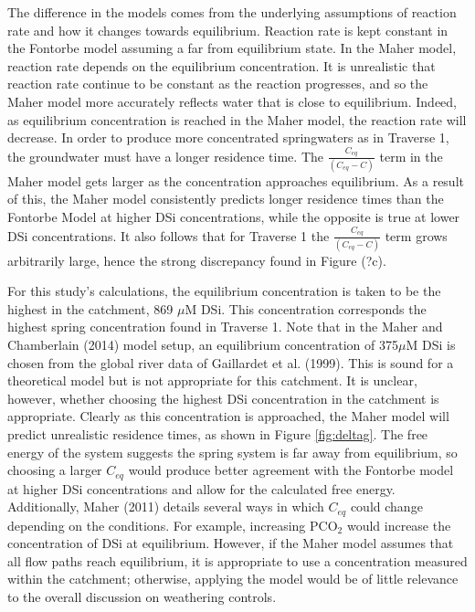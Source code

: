 The difference in the models comes from the underlying assumptions of reaction rate and how it changes towards equilibrium. Reaction rate is kept constant in the Fontorbe model assuming a far from equilibrium state. In the Maher model, reaction rate depends on the equilibrium concentration. It is unrealistic that reaction rate continue to be constant as the reaction progresses, and so the Maher model more accurately reflects water that is close to equilibrium. Indeed, as equilibrium concentration is reached in the Maher model, the reaction rate will decrease. In order to produce more concentrated springwaters as in Traverse 1, the groundwater must have a longer residence time. The $\frac{C_{eq}}{(C_{eq} - C)}$ term in the Maher model gets larger as the concentration approaches equilibrium. As a result of this, the Maher model consistently predicts longer residence times than the Fontorbe Model at higher DSi concentrations, while the opposite is true at lower DSi concentrations. It also follows that for Traverse 1 the $\frac{C_{eq}}{(C_{eq} - C)}$ term grows arbitrarily large, hence the strong discrepancy found in Figure (?c).

\bsk

For this study's calculations, the equilibrium concentration is taken to be the highest in the catchment, 869 $\mu$M DSi. This concentration corresponds the highest spring concentration found in Traverse 1. Note that in the Maher and Chamberlain (2014) model setup, an equilibrium concentration of 375$\mu$M DSi is chosen from the global river data of Gaillardet et al. (1999). This is sound for a theoretical model but is not appropriate for this catchment. It is unclear, however, whether choosing the highest DSi concentration in the catchment is appropriate. Clearly as this concentration is approached, the Maher model will predict unrealistic residence times, as shown in Figure \ref{fig:deltag}. The free energy of the system suggests the spring system is far away from equilibrium, so choosing a larger $C_{eq}$ would produce better agreement with the Fontorbe model at higher DSi concentrations and allow for the calculated free energy. Additionally, Maher (2011) details several ways in which $C_{eq}$ could change depending on the conditions. For example, increasing PCO$_2$ would increase the concentration of DSi at equilibrium. However, if the Maher model assumes that all flow paths reach equilibrium, it is appropriate to use a concentration measured within the catchment; otherwise, applying the model would be of little relevance to the overall discussion on weathering controls.


